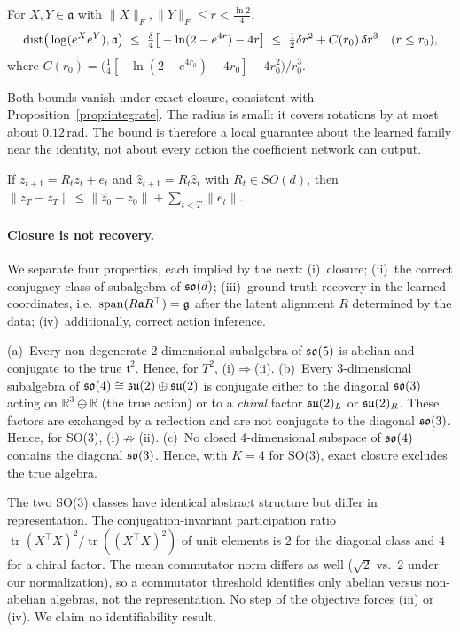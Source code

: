 \begin{proposition}\label{prop:bch}
For $X,Y\in\mathfrak a$ with $\|X\|_F,\|Y\|_F\le r<\tfrac{\ln 2}{4}$,
\[
\operatorname{dist}\!\big(\log(e^Xe^Y),\mathfrak a\big)\;\le\;\tfrac{\delta}{4}\big[-\ln(2-e^{4r})-4r\big]
\;\le\;\tfrac12\delta r^2+C(r_0)\,\delta r^3\quad(r\le r_0),
\]
where $C(r_0)=\big(\tfrac14[-\ln(2-e^{4r_0})-4r_0]-4r_0^2\big)/r_0^3$.
\end{proposition}

Both bounds vanish under exact closure, consistent with Proposition~\ref{prop:integrate}. The radius is
small: it covers rotations by at most about $0.12$\,rad. The bound is therefore a local guarantee about the
learned family near the identity, not about every action the coefficient network can output.

\begin{proposition}\label{prop:chain}
If $z_{t+1}=R_tz_t+e_t$ and $\hat z_{t+1}=R_t\hat z_t$ with $R_t\in SO(d)$, then
$\|\hat z_T-z_T\|\le\|\hat z_0-z_0\|+\sum_{t<T}\|e_t\|$.
\end{proposition}

\paragraph{Closure is not recovery.}
We separate four properties, each implied by the next:
(i)~closure;
(ii)~the correct conjugacy class of subalgebra of $\mathfrak{so}(d)$;
(iii)~ground-truth recovery in the learned coordinates, i.e.\ $\operatorname{span}(R\mathfrak aR^\top)=\mathfrak g$ after the
latent alignment $R$ determined by the data;
(iv)~additionally, correct action inference.

\begin{proposition}\label{prop:classify}
(a)~Every non-degenerate 2-dimensional subalgebra of $\mathfrak{so}(5)$ is abelian and conjugate to the true
$\mathfrak t^2$. Hence, for $T^2$, (i)$\Rightarrow$(ii).
(b)~Every 3-dimensional subalgebra of $\mathfrak{so}(4)\cong\mathfrak{su}(2)\oplus\mathfrak{su}(2)$ is conjugate either to the diagonal
$\mathfrak{so}(3)$ acting on $\mathbb R^3\oplus\mathbb R$ (the true action) or to a \emph{chiral} factor $\mathfrak{su}(2)_{L}$ or
$\mathfrak{su}(2)_{R}$. These factors are exchanged by a reflection and are not conjugate to the diagonal $\mathfrak{so}(3)$.
Hence, for SO(3), (i)$\not\Rightarrow$(ii).
(c)~No closed 4-dimensional subspace of $\mathfrak{so}(4)$ contains the diagonal $\mathfrak{so}(3)$. Hence, with $K{=}4$ for SO(3),
exact closure excludes the true algebra.
\end{proposition}

The two SO(3) classes have identical abstract structure but differ in representation. The conjugation-invariant
participation ratio $\operatorname{tr}(X^\top X)^2/\operatorname{tr}((X^\top X)^2)$ of unit elements is $2$
for the diagonal class and $4$ for a chiral factor. The mean commutator norm differs as well ($\sqrt2$ vs.\
$2$ under our normalization), so a commutator threshold identifies only abelian versus non-abelian algebras,
not the representation. No step of the objective forces (iii) or (iv). We claim no identifiability result.
